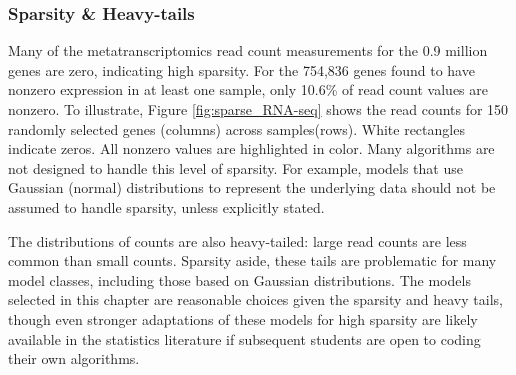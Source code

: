 \subsubsection{Sparsity \& Heavy-tails}
Many of the metatranscriptomics read count measurements for the 0.9 million genes are zero, indicating high sparsity.
For the 754,836 genes found to have nonzero expression in at least one sample, only 10.6\% of read count values are nonzero.
To illustrate, Figure \ref{fig:sparse_RNA-seq} shows the read counts for 150 randomly selected genes (columns) across samples(rows).
White rectangles indicate zeros.  All nonzero values are highlighted in color.
Many algorithms are not designed to handle this level of sparsity.
For example, models that use Gaussian (normal) distributions to represent the underlying data should not be assumed to handle sparsity, unless explicitly stated.

The distributions of counts are also heavy-tailed: large read counts are less common than small counts.
Sparsity aside, these tails are problematic for many model classes, including those based on Gaussian distributions.
The models selected in this chapter are reasonable choices given the sparsity and heavy tails, though even stronger adaptations of these models for high sparsity are likely available in the statistics literature if subsequent students are open to coding their own algorithms.




